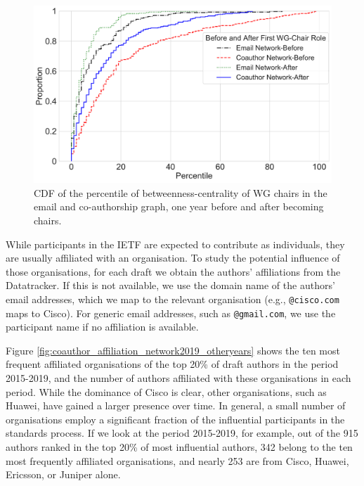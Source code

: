\documentclass[twocolumn,10pt]{article}
\newlength{\figureWidthOneColumn}
\newcommand{\pb}[1]{\vspace{0.75ex}\noindent{\textbf{#1}}}
\begin{document}
\begin{figure}
  \centering
  \includegraphics[width=\figureWidthOneColumn]{figures-prev/icwsm-2022/WG_chair_percentile_CDF_before_after.pdf}
  \caption{
    CDF of the percentile of betweenness-centrality of WG chairs in the
    email and co-authorship graph, one year before and after becoming
    chairs.
  }
  \label{fig:wg_chair_before_after}
\end{figure}

\pb{Influence of organisations:}
While participants in the IETF are expected to contribute as individuals,
they are usually affiliated with an organisation.  To study the potential
influence of those organisations, for each draft we obtain the authors'
affiliations from the Datatracker. If this is not available, we use the
domain name of the authors' email addresses, which we map to the relevant
organisation (e.g., \texttt{@cisco.com} maps to Cisco). For generic email
addresses, such as \texttt{@gmail.com}, we use the participant name if no
affiliation is available.

Figure \ref{fig:coauthor_affiliation_network2019_otheryears} shows the ten
most frequent affiliated organisations of the top 20\% of draft authors in
the period 2015-2019, and the number of authors affiliated with these
organisations in  each  period.  While the dominance of Cisco is clear,
other organisations, such as Huawei, have gained a larger presence over
time.  In general, a small number of organisations employ a significant
fraction of the influential participants in the standards process. If we
look at the period 2015-2019, for example, out of the 915 authors ranked in
the top 20\% of most influential authors, 342 belong to the ten most
frequently affiliated organisations, and nearly 253 are from Cisco, Huawei,
Ericsson, or Juniper alone.
\end{document}
